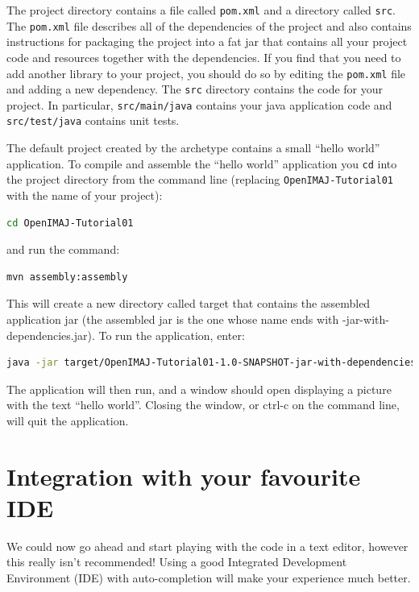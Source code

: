 The project directory contains a file called \verb+pom.xml+ and a directory called \verb+src+. 
The \verb+pom.xml+ file describes all of the dependencies of the project and also contains 
instructions for packaging the project into a fat jar that contains all your project code and 
resources together with the dependencies. If you find that you need to add another library to 
your project, you should do so by editing the \verb+pom.xml+ file and adding a new dependency. 
The \verb+src+ directory contains the code for your project. In particular, \verb+src/main/java+ 
contains your java application code and \verb+src/test/java+ contains unit tests.

The default project created by the archetype contains a small ``hello world'' application. To 
compile and assemble the ``hello world'' application you \verb+cd+ into the project directory from the command line (replacing \verb+OpenIMAJ-Tutorial01+ with the name of your project):
\begin{lstlisting}[language=bash]
cd OpenIMAJ-Tutorial01
\end{lstlisting}
and run the command:
\begin{lstlisting}[language=bash]
mvn assembly:assembly
\end{lstlisting}
This will create a new directory called target that contains the assembled application jar 
(the assembled jar is the one whose name ends with -jar-with-dependencies.jar). To run the 
application, enter: 
\begin{lstlisting}[language=bash]
java -jar target/OpenIMAJ-Tutorial01-1.0-SNAPSHOT-jar-with-dependencies.jar
\end{lstlisting}
The application will then run, and a window should open displaying a picture with the text 
``hello world''. Closing the window, or ctrl-c on the command line, will quit the application.

\section*{Integration with your favourite IDE}
We could now go ahead and start playing with the code in a text editor, however this really 
isn't recommended! Using a good Integrated Development Environment (IDE) with auto-completion will 
make your experience much better.

